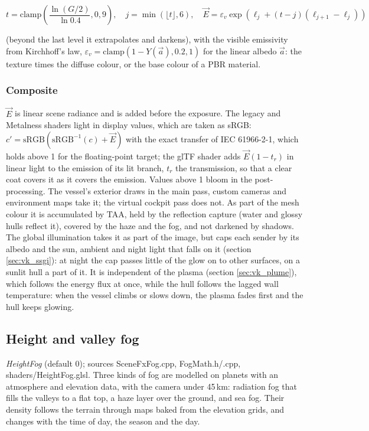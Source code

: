 \documentclass[Orbiter Technical Reference.tex]{subfiles}
\begin{document}
\begin{sloppypar}
\[ t = \mathrm{clamp}\left(\frac{\ln(G/2)}{\ln 0.4}, 0, 9\right), \quad j = \min(\lfloor t \rfloor, 6), \quad \vec{E} = \varepsilon_{v}\exp\left(\ell_{j} + (t - j)(\ell_{j+1} - \ell_{j})\right) \]

\noindent
(beyond the last level it extrapolates and darkens), with the visible emissivity from Kirchhoff's law, $\varepsilon_{v} = \mathrm{clamp}(1 - Y(\vec{a}), 0.2, 1)$ for the linear albedo $\vec{a}$: the texture times the diffuse colour, or the base colour of a PBR material.

\subsubsection{Composite}
$\vec{E}$ is linear scene radiance and is added before the exposure. The legacy and Metalness shaders light in display values, which are taken as sRGB: $c' = \mathrm{sRGB}(\mathrm{sRGB}^{-1}(c) + \vec{E})$ with the exact transfer of IEC 61966-2-1, which holds above 1 for the floating-point target; the glTF shader adds $\vec{E}(1 - t_{r})$ in linear light to the emission of its lit branch, $t_{r}$ the transmission, so that a clear coat covers it as it covers the emission. Values above 1 bloom in the post-processing. The vessel's exterior draws in the main pass, custom cameras and environment maps take it; the virtual cockpit pass does not. As part of the mesh colour it is accumulated by TAA, held by the reflection capture (water and glossy hulls reflect it), covered by the haze and the fog, and not darkened by shadows. The global illumination takes it as part of the image, but caps each sender by its albedo and the sun, ambient and night light that falls on it (section \ref{sec:vk_ssgi}): at night the cap passes little of the glow on to other surfaces, on a sunlit hull a part of it. It is independent of the plasma (section \ref{sec:vk_plume}), which follows the energy flux at once, while the hull follows the lagged wall temperature: when the vessel climbs or slows down, the plasma fades first and the hull keeps glowing.



\subsection{Height and valley fog}\label{sec:vk_fog}
\textit{HeightFog} (default 0); sources SceneFxFog.cpp, FogMath.h/.cpp, shaders/HeightFog.glsl. Three kinds of fog are modelled on planets with an atmosphere and elevation data, with the camera under 45\,km: radiation fog that fills the valleys to a flat top, a haze layer over the ground, and sea fog. Their density follows the terrain through maps baked from the elevation grids, and changes with the time of day, the season and the day.


\end{sloppypar}
\end{document}
